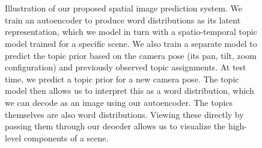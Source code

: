 \begin{figure}
    \centering
    \\
    \\
    \caption{Illustration of our proposed spatial image prediction system.
             \protect{} We train an autoencoder to produce word distributions as its latent representation, which we model in turn with a spatio-temporal topic model trained for a specific scene. We also train a separate model to predict the topic prior based on the camera pose (its pan, tilt, zoom configuration) and previously observed topic assignments.
             \protect{} At test time, we predict a topic prior for a new camera pose. The topic model then allows us to interpret this as a word distribution, which we can decode as an image using our autoencoder.
             \protect{} The topics themselves are also word distributions. Viewing these directly by passing them through our deocder allows us to visualize the high-level components of a scene.}
    \label{fig:spatial-system}
\end{figure}

